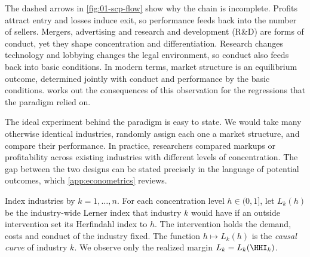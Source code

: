 The dashed arrows in \cref{fig:01-scp-flow} show why the chain is incomplete. Profits attract entry and
losses induce exit, so performance feeds back into the number of sellers. Mergers, advertising and
research and development (R\&D) are forms of conduct, yet they shape concentration and differentiation.
Research changes technology and lobbying changes the legal environment, so conduct also feeds back into
basic conditions. In modern terms, market structure is an equilibrium outcome, determined jointly with
conduct and performance by the basic conditions.  works out the
consequences of this observation for the regressions that the paradigm relied on.

The ideal experiment behind the paradigm is easy to state. We would take many otherwise identical
industries, randomly assign each one a market structure, and compare their performance. In practice,
researchers compared markups or profitability across existing industries with different levels of
concentration. The gap between the two designs can be stated precisely in the language of potential
outcomes, which \cref{app:econometrics} reviews.

\begin{definition}\label{def:01-potential-margins}
Index industries by $k = 1, \dots, n$. For each concentration level $h \in (0, 1]$, let $L_k(h)$ be the
industry-wide Lerner index that industry $k$ would have if an outside intervention set its Herfindahl
index to $h$. The intervention holds the demand, costs and conduct of the industry fixed. The function
$h \mapsto L_k(h)$ is the \emph{causal curve} of industry $k$. We observe only the realized margin $L_k
= L_k(\HHI_k)$.
\end{definition}

